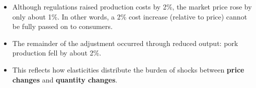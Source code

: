 \documentclass[
  letterpaper,
  DIV=11,
  numbers=noendperiod]{scrartcl}
\begin{document}
\begin{tcolorbox}[enhanced jigsaw, bottomtitle=1mm, colbacktitle=quarto-callout-note-color!10!white, opacitybacktitle=0.6, colback=white, colframe=quarto-callout-note-color-frame, rightrule=.15mm, leftrule=.75mm, left=2mm, breakable, title=\textcolor{quarto-callout-note-color}{\faInfo}\hspace{0.5em}{Interpretation}, toptitle=1mm, titlerule=0mm, arc=.35mm, bottomrule=.15mm, toprule=.15mm, opacityback=0, coltitle=black]

\begin{itemize}
\item
  Although regulations raised production costs by 2\%, the market price
  rose by only about 1\%. In other words, a 2\% cost increase (relative
  to price) cannot be fully passed on to consumers.
\item
  The remainder of the adjustment occurred through reduced output: pork
  production fell by about 2\%.
\item
  This reflects how elasticities distribute the burden of shocks between
  \textbf{price changes} and \textbf{quantity changes}.
\end{itemize}

\end{tcolorbox}
\end{document}
